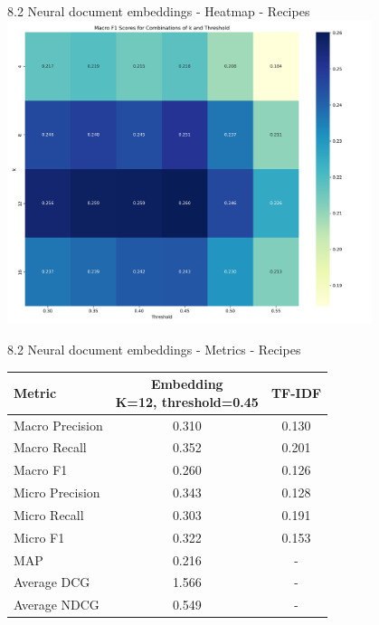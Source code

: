 \documentclass{beamer}
\begin{document}
\begin{frame}{8.2 Neural document embeddings - Heatmap - Recipes}
  \centering
  \includegraphics[width=0.8\textwidth]{recipies_embeddings_heatmap.png_1747347706.png}
\end{frame}


\begin{frame}{8.2 Neural document embeddings - Metrics - Recipes}
  \begin{table}
    \centering
    \begin{tabular}{|l|c|c|}
      \hline
      Metric          & \makecell{Embedding         \\K=12, threshold=0.45} & TF-IDF \\
      \hline
      Macro Precision & 0.310               & 0.130 \\
      Macro Recall    & 0.352               & 0.201 \\
      Macro F1        & 0.260               & 0.126 \\
      Micro Precision & 0.343               & 0.128 \\
      Micro Recall    & 0.303               & 0.191 \\
      Micro F1        & 0.322               & 0.153 \\
      MAP             & 0.216               & -     \\
      Average DCG     & 1.566               & -     \\
      Average NDCG    & 0.549               & -     \\
      \hline
    \end{tabular}
  \end{table}
\end{frame}
\end{document}
